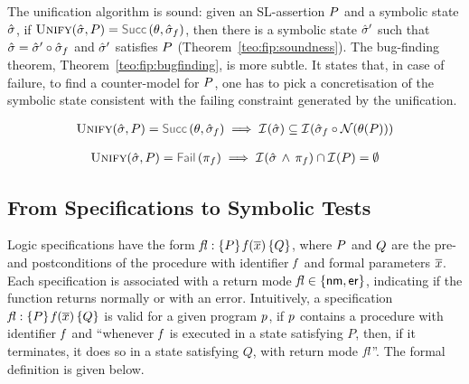 The unification algorithm is sound: 
given an SL-assertion $P$ and a symbolic state $\hat{\sigma}$, if
$\unificationfun(\sstate, \pass) = \success{\subst, \sstate_f}$, then there is a symbolic state
$\hat{\sigma}'$ such that $\hat{\sigma} = \hat{\sigma}' \circ \hat{\sigma}_f$ and $\hat{\sigma}'$ satisfies $P$ (Theorem~\ref{teo:fip:soundness}). 
The bug-finding theorem, Theorem~\ref{teo:fip:bugfinding}, is more subtle. It states that, 
in case of failure, to find a counter-model for $P$, one has to pick a concretisation of the 
symbolic state consistent with the failing constraint generated by the unification.%


\begin{theorem}\label{teo:fip:soundness}
$$
\begin{array}{l}
	\unificationfun(\sstate, \pass) = \success{\subst, \sstate_f}
        \implies 
        \interpret{}{}(\sstate) \subseteq \interpret{}{}(\sstate_f \statecompose \normaliser(\subst(\pass)))
\end{array}
$$ 
\end{theorem}

\begin{theorem}\label{teo:fip:bugfinding}
$$
\begin{array}{l}
\unificationfun(\sstate, \pass) = \fail{\pc_f} 
   \implies
   \interpret{}{}(\sstate \, \wedge \, \pc_f) \cap \interpret{}{}(\pass) = \emptyset
\end{array}
$$ 
\end{theorem}



\subsection{From Specifications to Symbolic Tests}\label{specs:to:symbolic:tests}

\jsil Logic specifications have the form ${\mathit{fl}} : \{ P \} \, \mathit{f}(\overline{x}) \, \{ Q \}$, where $P$ and $Q$ are the 
pre- and postconditions of the procedure with identifier $\mathit{f}$ and formal parameters $\overline{x}$. 
Each specification is associated with a return mode $\mathit{fl} \in \{ {\sf nm}, {\sf er} \}$, indicating if the function
 returns normally or with an error. 
 Intuitively, a specification ${\mathit{fl}} : \{ P \} \, \mathit{f}(\overline{x}) \, \{ Q \}$ is 
valid for a given \jsil program $p$, if $p$ contains a procedure with identifier 
$\mathit{f}$ and ``whenever $\mathit{f}$ is executed in a state satisfying $P$, then, 
if it terminates, it does so in a state satisfying $Q$, with return mode $\mathit{fl}$''.
The formal definition is given below. 


